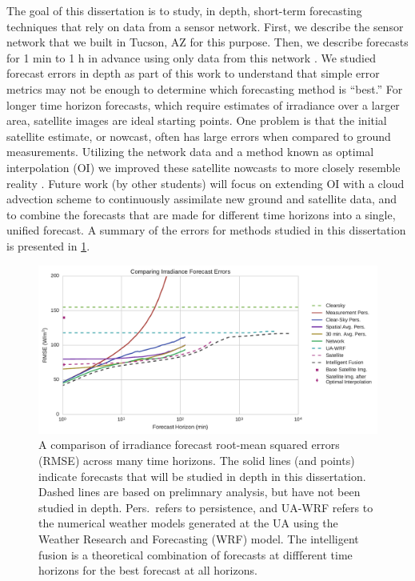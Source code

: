 \documentclass[12pt,letterpaper,notitlepage,openany]{article}
\begin{document}
The goal of this dissertation is to study, in depth, short-term
forecasting techniques that rely on data from a sensor network.
First, we describe the sensor network that we built in Tucson, AZ for
this purpose.
Then, we describe forecasts for 1 min to 1 h in advance using only
data from this network \citep{Lorenzo2015c}.
We studied forecast errors in depth as part of this work to understand
that simple error metrics may not be enough to determine which
forecasting method is ``best.''
For longer time horizon forecasts, which require estimates of
irradiance over a larger area, satellite images are ideal starting
points.
One problem is that the initial satellite estimate, or nowcast, often
has large errors when compared to ground measurements.
Utilizing the network data and a method known as optimal interpolation
(OI) we improved these satellite nowcasts to more closely resemble
reality \citep{Lorenzo2017}.
Future work (by other students) will focus on extending OI with a
cloud advection scheme to continuously assimilate new ground and
satellite data, and to combine the forecasts that are made for
different time horizons into a single, unified forecast.
A summary of the errors for methods studied in this dissertation is
presented in \cref{fig:bullshitplot}.

\begin{figure}[h]
\includegraphics[width=\textwidth]{../dissertation/figs/timehorizon.pdf}
\caption[Irradiance forecast errors across forecast horizons]{A
  comparison of irradiance forecast root-mean squared errors (RMSE)
  across many time horizons. The solid lines (and points) indicate
  forecasts that will be studied in depth in this dissertation. Dashed
  lines are based on prelimnary analysis, but have not been studied in
  depth. Pers.\ refers to persistence, and UA-WRF refers to the
  numerical weather models generated at the UA using the Weather
  Research and Forecasting (WRF) model. The intelligent fusion is a
  theoretical combination of forecasts at diffferent time horizons for
  the best forecast at all horizons.}
\label{fig:bullshitplot}
\end{figure}
\end{document}
